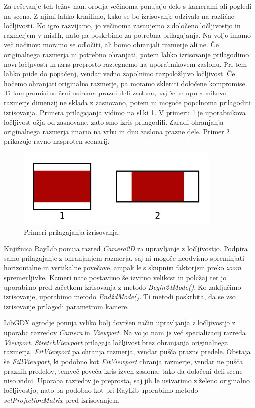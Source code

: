 \documentclass[12pt,a4paper,twoside]{book}
\begin{document}
Za reševanje teh težav nam orodja večinoma ponujajo delo s kamerami ali pogledi na sceno. Z njimi lahko krmilimo, kako se bo izrisovanje odzivalo na različne ločljivosti. Ko igro razvijamo, jo večinoma zasnujemo z določeno ločljivostjo in razmerjem v mislih, nato pa poskrbimo za potrebna prilagajanja. Na voljo imamo več načinov: moramo se odločiti, ali bomo ohranjali razmerje ali ne. Če originalnega razmerja ni potrebno ohranjati, potem lahko izrisovanje prilagodimo novi ločljivosti in izris preprosto raztegnemo na uporabnikovem zaslonu. Pri tem lahko pride do popačenj, vendar vedno zapolnimo razpoložljivo ločljivost. Če hočemo ohranjati originalno razmerje, pa moramo skleniti določene kompromise. Ti kompromisi so črni oziroma prazni deli zaslona, saj če se uporabnikovo razmerje dimenzij ne sklada z zasnovano, potem ni mogoče popolnoma prilagoditi izrisovanja. Primera prilagajanja vidimo na sliki \ref{slika:prilagajanje}. V primeru 1 je uporabnikova ločljivost ožja od zasnovane, zato smo izris prilagodili. Zaradi ohranjanja originalnega razmerja imamo na vrhu in dnu zaslona prazne dele. Primer 2 prikazuje ravno nasproten scenarij.

\begin{figure}[h]
	\centering
	\includegraphics[width=10cm]{prilagajanje}
	\caption{Primeri prilagajanja izrisovanja.}
	\label{slika:prilagajanje}
\end{figure}

Knjižnica RayLib ponuja razred \textit{Camera2D} za upravljanje z ločljivostjo. Podpira samo prilagajanje z ohranjanjem razmerja, saj ni mogoče neodvisno spreminjati horizontalne in vertikalne povečave, ampak le s skupnim faktorjem preko \textit{zoom} spremenljivke. Kameri nato postavimo še izvirno velikost in položaj ter jo uporabimo pred začetkom izrisovanja z metodo \textit{Begin2dMode()}. Ko zaključimo izrisovanje, uporabimo metodo \textit{End2dMode()}. Ti metodi poskrbita, da se vso izrisovanje prilagodi parametrom kamere.

LibGDX ogrodje ponuja veliko bolj dovršen način upravljanja z ločljivostjo z uporabo razredov \textit{Camera} in \textit{Viewport}. Na voljo nam je več specializacij razreda \textit{Viewport}. \textit{StretchViewport} prilagaja ločljivost brez ohranjanja originalnega razmerja, \textit{FitViewport} pa ohranja razmerja, vendar pušča prazne predele. Obstaja še \textit{FillViewport}, ki podobno kot \textit{FitViewport} ohranja razmerje, vendar ne pušča praznih predelov, temveč poveča izris izven zaslona, tako da določeni deli scene niso vidni. Uporaba razredov je preprosta, saj jih le ustvarimo z želeno originalno ločljivostjo, nato pa podobno kot pri RayLib uporabimo metodo \textit{setProjectionMatrix} pred izrisovanjem.
\end{document}
